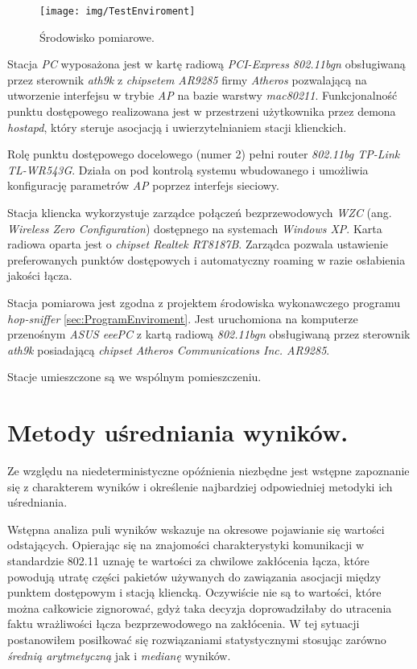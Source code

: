\begin{figure}[htb]
\begin{center}
\texttt{[image: img/TestEnviroment]}
\caption{Środowisko pomiarowe.}
\label{TestEnviroment}
\end{center}
\end{figure}

Stacja \emph{PC} wyposażona jest w kartę radiową \emph{PCI-Express 802.11bgn} obsługiwaną przez sterownik \emph{ath9k} z \emph{chipsetem} \emph{AR9285} firmy \emph{Atheros} pozwalającą na utworzenie interfejsu w trybie \emph{AP} na bazie warstwy \emph{mac80211}. Funkcjonalność punktu dostępowego realizowana jest w przestrzeni użytkownika przez demona \emph{hostapd}, który steruje asocjacją i uwierzytelnianiem stacji klienckich. 

Rolę punktu dostępowego docelowego (numer 2) pełni router \emph{802.11bg TP-Link TL-WR543G}. Działa on pod kontrolą systemu wbudowanego i umożliwia konfigurację parametrów \emph{AP} poprzez interfejs sieciowy. 

Stacja kliencka wykorzystuje zarządce połączeń bezprzewodowych \emph{WZC} (ang. \emph{Wireless Zero Configuration}) dostępnego na systemach \emph{Windows XP}. Karta radiowa oparta jest o \emph{chipset Realtek RT8187B}. Zarządca pozwala ustawienie preferowanych punktów dostępowych i automatyczny roaming w razie osłabienia jakości łącza. 

Stacja pomiarowa jest zgodna z projektem środowiska wykonawczego programu \emph{hop-sniffer} \ref{sec:ProgramEnviroment}. Jest uruchomiona na komputerze przenośnym \emph{ASUS eeePC} z kartą radiową \emph{802.11bgn} obsługiwaną przez sterownik \emph{ath9k} posiadającą \emph{chipset} \emph{Atheros Communications Inc. AR9285}.

Stacje umieszczone są we wspólnym pomieszczeniu.

\section{Metody uśredniania wyników.}

Ze względu na niedeterministyczne opóźnienia niezbędne jest wstępne zapoznanie się z charakterem wyników i określenie najbardziej odpowiedniej metodyki ich uśredniania. 

Wstępna analiza puli wyników wskazuje na okresowe pojawianie się wartości odstających. Opierając się na znajomości charakterystyki komunikacji w standardzie 802.11 uznaję te wartości za chwilowe zakłócenia łącza, które powodują utratę części pakietów używanych do zawiązania asocjacji między punktem dostępowym i stacją kliencką. Oczywiście nie są to wartości, które można całkowicie zignorować, gdyż taka decyzja doprowadziłaby do utracenia faktu wrażliwości łącza bezprzewodowego na zakłócenia. W tej sytuacji postanowiłem posiłkować się rozwiązaniami statystycznymi stosując zarówno \emph{średnią arytmetyczną} jak i \emph{medianę} wyników. 

